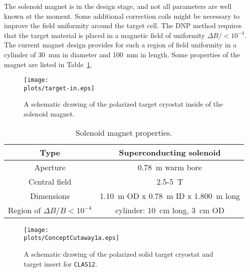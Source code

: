 The solenoid magnet is in the design stage, and not all parameters are well 
known at the moment.  Some additional correction coils might be necessary to 
improve the field uniformity around the target cell. The DNP method requires 
that the target material is placed in a magnetic field of uniformity 
$\Delta B/ < 10^{-4}$. The current magnet design provides for such a region 
of field uniformity in a cylinder of 30~mm in diameter and 100~mm in length. 
Some properties of the magnet are listed in Table~\ref{Magnet}. 

\begin{figure}[htbp]
\centering
\texttt{[image: \\plots/target-in.eps]}
\caption{\small{A schematic drawing of the polarized target cryostat 
inside of the solenoid magnet.}}
\label{target-in}
\end{figure}

\begin{table}[htbp]
\begin{center}
\begin{tabular}{|c|c|} \hline
Type           & Superconducting solenoid \\ \hline 
Aperture       & 0.78~m warm bore \\ \hline
Central field  & 2.5-5~T \\ \hline
Dimensions     & 1.10~m OD x 0.78~m ID x 1.800~m long \\ \hline
Region of $\Delta B/B < 10^{-4}$ &  cylinder: 10~cm long, 3~cm OD \\ \hline
\end{tabular}
\end{center}
\caption{\small{Solenoid magnet properties.}}
\label{Magnet}
\end{table}

\begin{figure}[ht]
\centering
\texttt{[image: \\plots/ConceptCutaway1a.eps]}
\caption{\small{A schematic drawing of the polarized solid target cryostat 
and target insert for {\tt CLAS12}.}} 
\label{cryostat}
\end{figure}

